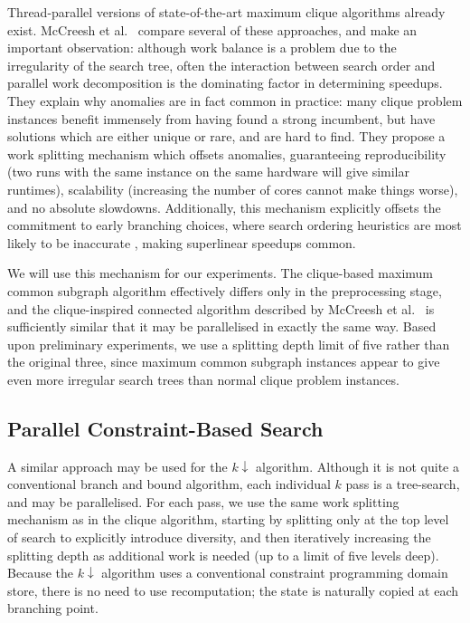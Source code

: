 \documentclass{llncs}
\begin{document}
Thread-parallel versions of state-of-the-art maximum clique algorithms already exist.
McCreesh et al.\ \cite{DBLP:journals/topc/McCreeshP15} compare several of these approaches, and make
an important observation: although work balance is a problem due to the irregularity of the search
tree, often the interaction between search order and parallel work decomposition is the dominating
factor in determining speedups. They explain why anomalies are in fact common in practice: many
clique problem instances benefit immensely from having found a strong incumbent, but have solutions
which are either unique or rare, and are hard to find. They propose a work splitting mechanism which
offsets anomalies, guaranteeing reproducibility (two runs with the same instance on the same
hardware will give similar runtimes), scalability (increasing the number of cores cannot make things
worse), and no absolute slowdowns.  Additionally, this mechanism explicitly offsets the commitment
to early branching choices, where search ordering heuristics are most likely to be inaccurate
\cite{DBLP:conf/ijcai/HarveyG95,DBLP:conf/cp/ChuSS09}, making superlinear speedups common.

We will use this mechanism for our experiments.  The clique-based maximum common subgraph algorithm
effectively differs only in the preprocessing stage, and the clique-inspired connected algorithm
described by McCreesh et al.\ \cite{DBLP:conf/cp/McCreeshNPS16} is sufficiently similar that it may be parallelised in
exactly the same way. Based upon preliminary experiments, we use a splitting depth limit of five
rather than the original three, since maximum common subgraph instances appear to give even more
irregular search trees than normal clique problem instances.

\subsection{Parallel Constraint-Based Search}

A similar approach may be used for the $k{\downarrow}$ algorithm. Although it is not quite a
conventional branch and bound algorithm, each individual $k$ pass is a tree-search, and may be
parallelised. For each pass, we use the same work splitting mechanism as in the clique algorithm,
starting by splitting only at the top level of search to explicitly introduce diversity, and then
iteratively increasing the splitting depth as additional work is needed (up to a limit of five
levels deep).  Because the $k{\downarrow}$ algorithm uses a conventional constraint programming
domain store, there is no need to use recomputation; the state is naturally copied at each branching
point.
\end{document}

